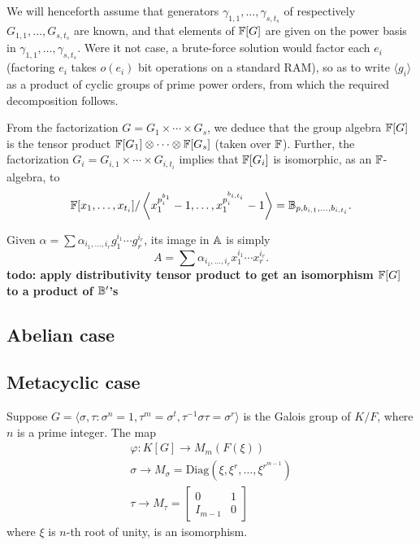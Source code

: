 We will henceforth assume that generators
$\gamma_{1,1},\dots,\gamma_{s,t_s}$ of respectively
$G_{1,1},\dots,G_{s,t_s}$ are known, and that elements of $\mathbb{F}[G]$ are
given on the power basis in $\gamma_{1,1},\dots,\gamma_{s,t_s}$. Were
it not case, a brute-force solution would factor each $e_i$ (factoring
$e_i$ takes $o(e_i)$ bit operations on a standard RAM), so as to write
$\langle g_i \rangle$ as a product of cyclic groups of prime power
orders, from which the required decomposition follows.

From the factorization $G = G_1 \times \cdots \times G_s$, we deduce
that the group algebra $\mathbb{F}[G]$ is the tensor product $\mathbb{F}[G_1]
\otimes \cdots \otimes \mathbb{F}[G_s]$ (taken over $\mathbb{F}$). Further, the 
factorization $G_i = G_{i,1} \times \cdots \times G_{i,t_i}$
implies that $\mathbb{F}[G_i]$ is isomorphic, as an $\mathbb{F}$-algebra, to
$$\mathbb{F}[x_{1},\dots,x_{t_i}]/\left \langle x_{1}^{p_i^{b_{1}}}-1,\dots,x_{1}^{p_i^{b_{i,t_i}}}-1\right\rangle
=\mathbb{B}_{p,b_{i,1},\dots,b_{i,t_i}}.$$


Given $\alpha = \sum \alpha_{i_1,\dots,i_r} g_1^{i_1}\cdots
g_r^{i_r}$, its image in $\mathbb{A}$ is simply 
$$A= \sum
\alpha_{i_1,\dots,i_r} x_1^{i_1}\cdots x_r^{i_r}.$$
{\bf todo: apply distributivity tensor product to get an isomorphism
$\mathbb{F}[G]$ to a product of $\mathbb{B}'$'s}







\subsection{Abelian case}

\subsection{Metacyclic case}

\begin{proposition}
Suppose $G = \langle \sigma , \tau : \sigma^n = 1, \tau^m = \sigma^t, \tau^{-1} \sigma \tau = \sigma^r \rangle$ is the Galois group 
of $K/F$, where $n$ is a prime integer. The map 
\begin{equation}
\begin{split}
\varphi: K[G] \longrightarrow M_{m}(F(\xi))\\
\sigma \longrightarrow M_{\sigma} = \mathrm{Diag}(\xi, \xi^r, \ldots , \xi^{r^{m-1}})\\
\tau \longrightarrow 
M_{\tau} = \left[ \begin{array}{l|l}
0 & 1\\
\hline
I_{m-1}& 0
\end{array} \right] 
\end{split}
\end{equation}
where $\xi$ is $n$-th root of unity, is an isomorphism.
\end{proposition}

